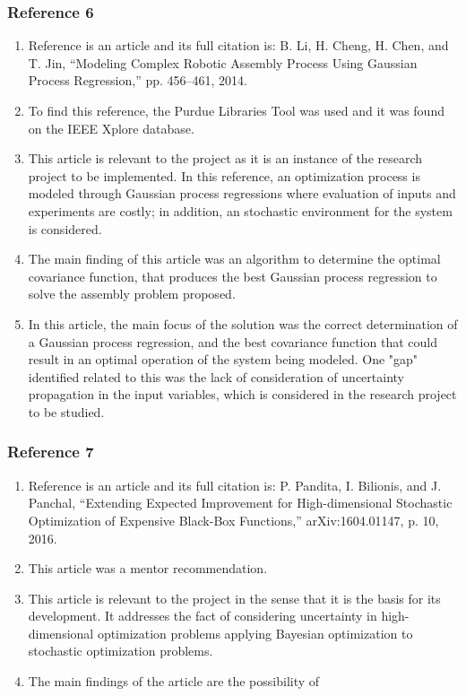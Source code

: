 \documentclass{journal}
\begin{document}
\subsubsection{Reference 6} 
\begin{enumerate}
	\item Reference \cite{Li2014} is an article and its full citation is: B. Li, H. Cheng, H. Chen, and T. Jin, “Modeling Complex Robotic Assembly Process Using Gaussian Process Regression,” pp. 456–461, 2014.
	\item To find this reference, the Purdue Libraries Tool was used and it was found on the IEEE Xplore database.
	\item This article is relevant to the project as it is an instance of the research project to be implemented. In this reference, an optimization process is modeled through Gaussian process regressions where evaluation of inputs and experiments are costly; in addition, an stochastic environment for the system is considered.
	\item The main finding of this article was an algorithm to determine the optimal covariance function, that produces the best Gaussian process regression to solve the assembly problem proposed.  
	\item In this article, the main focus of the solution was the correct determination of a Gaussian process regression, and the best covariance function that could result in an optimal operation of the system being modeled. One "gap" identified related to this was the lack of consideration of uncertainty propagation in the input variables, which is considered in the research project to be studied.
\end{enumerate}

\subsubsection{Reference 7}
\begin{enumerate}
	\item Reference \cite{Pandita2016} is an article and its full citation is: P. Pandita, I. Bilionis, and J. Panchal, “Extending Expected Improvement for High-dimensional Stochastic Optimization of Expensive Black-Box Functions,” arXiv:1604.01147, p. 10, 2016.
	\item This article was a mentor recommendation.
	\item This article is relevant to the project in the sense that it is the basis for its development. It addresses the fact of considering uncertainty in high-dimensional optimization problems applying Bayesian optimization to stochastic optimization problems.
	\item The main findings of the article are the possibility of 
\end{enumerate}
\end{document}
